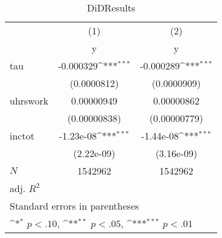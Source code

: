 \begin{table}[htbp]\centering
\def\sym#1{\ifmmode^{#1}\else\(^{#1}\)\fi}
\caption{DiDResults}
\begin{tabular}{l*{2}{c}}
\hline\hline
            &\multicolumn{1}{c}{(1)}&\multicolumn{1}{c}{(2)}\\
            &\multicolumn{1}{c}{y}&\multicolumn{1}{c}{y}\\
\hline
tau         &   -0.000329\sym{***}&   -0.000289\sym{***}\\
            & (0.0000812)         & (0.0000909)         \\
[1em]
uhrswork    &  0.00000949         &  0.00000862         \\
            &(0.00000838)         &(0.00000779)         \\
[1em]
inctot      &   -1.23e-08\sym{***}&   -1.44e-08\sym{***}\\
            &  (2.22e-09)         &  (3.16e-09)         \\
\hline
\(N\)       &     1542962         &     1542962         \\
adj. \(R^{2}\)&                     &                     \\
\hline\hline
\multicolumn{3}{l}{\footnotesize Standard errors in parentheses}\\
\multicolumn{3}{l}{\footnotesize \sym{*} \(p<.10\), \sym{**} \(p<.05\), \sym{***} \(p<.01\)}\\
\end{tabular}
\end{table}
